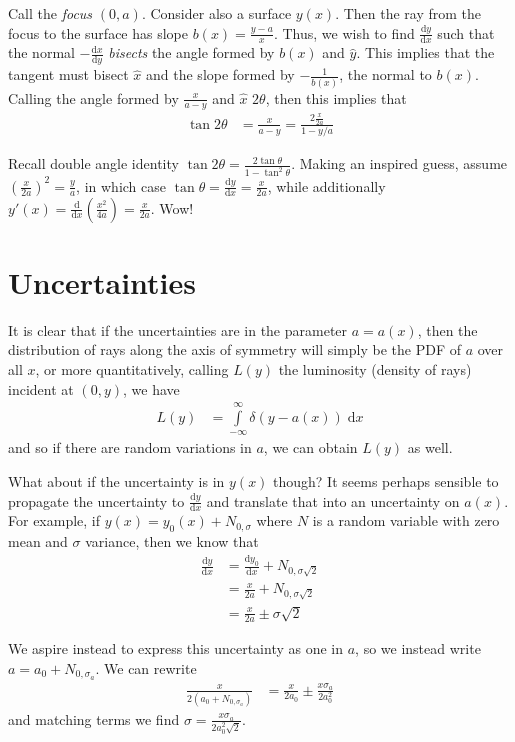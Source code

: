 \documentclass[12pt]{report}
\newcommand{\rd}[2]{\frac{\mathrm{d}#1}{\mathrm{d}#2}}
\begin{document}
Call the \emph{focus} $(0, a)$. Consider also a surface $y(x)$. Then the ray
from the focus to the surface has slope $b(x) = \frac{y - a}{x}$. Thus, we wish
to find $\rd{y}{x}$ such that the normal $-\rd{x}{y}$ \emph{bisects} the angle
formed by $b(x)$ and $\hat{y}$. This implies that the tangent must bisect
$\hat{x}$ and the slope formed by $-\frac{1}{b(x)}$, the normal to $b(x)$.
Calling the angle formed by $\frac{x}{a - y}$ and $\hat{x}$ $2\theta$, then this
implies that
\begin{align*}
    \tan 2\theta &= \frac{x}{a - y} = \frac{2\frac{x}{2a}}{1 - y/a}
\end{align*}

Recall double angle identity $\tan 2\theta = \frac{2\tan \theta}{1 -
\tan^2\theta}$. Making an inspired guess, assume $\left( \frac{x}{2a}
\right)^2 = \frac{y}{a}$, in which case $\tan\theta = \rd{y}{x} = \frac{x}{2a}$,
while additionally $y'(x) = \rd{}{x}\left( \frac{x^2}{4a} \right) =
\frac{x}{2a}$. Wow!

\section{Uncertainties}

It is clear that if the uncertainties are in the parameter $a = a(x)$, then the
distribution of rays along the axis of symmetry will simply be the PDF of $a$
over all $x$, or more quantitatively, calling $L(y)$ the luminosity (density of
rays) incident at $(0, y)$, we have
\begin{align*}
    L(y) &= \int\limits_{-\infty}^{\infty}\delta(y - a(x))\;\mathrm{d}x
\end{align*}
and so if there are random variations in $a$, we can obtain $L(y)$ as well.

What about if the uncertainty is in $y(x)$ though? It seems perhaps sensible to
propagate the uncertainty to $\rd{y}{x}$ and translate that into an uncertainty
on $a(x)$. For example, if $y(x) = y_0(x) + N_{0, \sigma}$ where $N$ is a random
variable with zero mean and $\sigma$ variance, then we know that
\begin{align*}
    \rd{y}{x}
        &= \rd{y_0}{x} + N_{0, \sigma\sqrt{2}}\\
        &= \frac{x}{2a} + N_{0, \sigma\sqrt{2}}\\
        &= \frac{x}{2a} \pm \sigma \sqrt{2}
\end{align*}

We aspire instead to express this uncertainty as one in $a$, so we instead write
$a = a_0 + N_{0, \sigma_a}$. We can rewrite
\begin{align*}
    \frac{x}{2(a_0 + N_{0, \sigma_a})}
        &= \frac{x}{2a_0} \pm \frac{x \sigma_a}{2 a_0^2}
\end{align*}
and matching terms we find $\sigma = \frac{x\sigma_a}{2a_0^2 \sqrt{2}}$.
\end{document}
